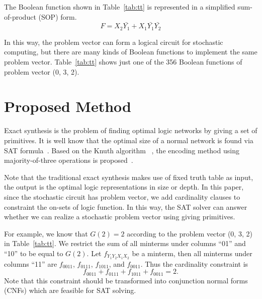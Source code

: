 \documentclass[conference,letterpaper]{IEEEtran}
\begin{document}
The Boolean function shown in Table~\ref{tab:tt} is represented in a simplified sum-of-product (SOP) form.
\begin{equation}
F=X_{2}\bar{Y_{1}}+X_{1} \bar{Y_{1}}\bar{Y_{2}}
\end{equation}

In this way, the problem vector can form a logical circuit for stochastic computing, but there are many kinds of Boolean functions to implement the same problem vector. Table~\ref{tab:tt} shows just one of the 356 Boolean functions of problem vector (0, 3, 2).


\section*{Proposed Method}
Exact synthesis is the problem of finding optimal logic networks by giving a set of primitives. 
It is well know that the optimal size of a normal network is found via SAT formula~\cite{3}. Based on the Knuth algorithm ~\cite{4}, the encoding method using majority-of-three operations is proposed~\cite{6}. 

Note that the traditional exact synthesis makes use of fixed truth table as input, the output is the optimal logic representations in size or depth.
In this paper, since the stochastic circuit has problem vector, we add cardinality clauses to constraint the on-sets of logic function. In this way, the SAT solver can answer whether we can realize a stochastic problem vector using giving primitives. 

For example, we know that $G(2) = 2$ according to the problem vector (0, 3, 2) in Table~\ref{tab:tt}. We restrict the sum of all minterms under columns ``01'' and ``10'' to be equal to $G(2)$. 
Let $f_{Y_1Y_2X_1X_2}$ be a minterm, then all minterms under columns ``11''
are $f_{0011}$, $f_{0111}$, $f_{1011}$, and $f_{0011}$.
Thus the cardinality constraint is 
\begin{equation}
f_{0011} + f_{0111} + f_{1011} + f_{0011} = 2.
\end{equation}
Note that this constraint should be transformed into conjunction normal forms (CNFs) which are feasible for SAT solving.
\end{document}
